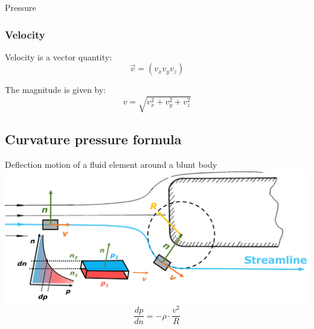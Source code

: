 \documentclass{article}
\begin{document}
\begin{multicols}{2}
\begin{theorybox}{Pressure}
    \subsubsection{Velocity}
    Velocity is a vector quantity:
    \begin{equation}
        \vec{v} = \left(v_x v_y v_z\right)
    \end{equation}

    The magnitude is given by:
    \begin{equation}
        v = \sqrt{v_x^2 + v_y^2 + v_z^2}
    \end{equation}
\end{theorybox}

\subsection{Curvature pressure formula}
\begin{examplebox}{Deflection motion of a fluid element around a blunt body}
    \includegraphics[width=\textwidth]{media/pressure_curvatur.png}
    \vspace*{-0.6cm}
    \begin{equation}
        \dfrac{dp}{dn} = -\rho\cdot\dfrac{v^2}{R}
    \end{equation}
\end{examplebox}

\vfill
\phantom{}
\end{multicols}
\end{document}
